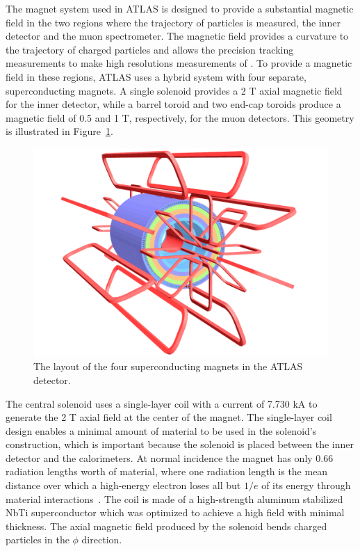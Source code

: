 The magnet system used in \ac{ATLAS} is designed to provide a substantial magnetic field in the two regions where the trajectory of particles is measured, the inner detector and the muon spectrometer.
The magnetic field provides a curvature to the trajectory of charged particles and allows the precision tracking measurements to make high resolutions measurements of \pt.
To provide a magnetic field in these regions, \ac{ATLAS} uses a hybrid system with four separate, superconducting magnets.
A single solenoid provides a 2 T axial magnetic field for the inner detector, while a barrel toroid and two end-cap toroids produce a magnetic field of 0.5 and 1 T, respectively, for the muon detectors.
This geometry is illustrated in Figure~\ref{fig:magnets_overview}.

\begin{figure}[hbtp]
\centering
\includegraphics[width=\fullfig]{figures/magnets_overview.pdf}
\caption{The layout of the four superconducting magnets in the \ac{ATLAS} detector.}
\label{fig:magnets_overview}
\end{figure}

The central solenoid uses a single-layer coil with a current of 7.730 kA to generate the 2 T axial field at the center of the magnet. 
The single-layer coil design enables a minimal amount of material to be used in the solenoid's construction, which is important because the solenoid is placed between the inner detector and the calorimeters.
At normal incidence the magnet has only 0.66 radiation lengths worth of material, where one radiation length is the mean distance over which a high-energy electron loses all but $1/e$ of its energy through material interactions~\cite{pdg}.
The coil is made of a high-strength aluminum stabilized NbTi superconductor which was optimized to achieve a high field with minimal thickness.
The axial magnetic field produced by the solenoid bends charged particles in the $\phi$ direction.


